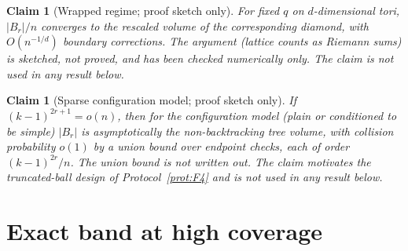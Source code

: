 \documentclass[pdflatex,sn-mathphys-num]{sn-jnl}
\theoremstyle{thmstyleone}%
\newtheorem{claim}[theorem]{Claim}
\theoremstyle{thmstylethree}%
\theoremstyle{thmstyletwo}%
\begin{document}
\begin{claim}[Wrapped regime; proof sketch only]
\label{prop:B4}
For fixed $q$ on $d$-dimensional tori, $|B_r|/n$ converges to the
rescaled volume of the corresponding diamond, with $O(n^{-1/d})$
boundary corrections. The argument (lattice counts as Riemann sums) is
sketched, not proved, and has been checked numerically only. The claim
is not used in any result below.
\end{claim}

\begin{claim}[Sparse configuration model; proof sketch only]
\label{prop:B5}
If $(k-1)^{2r+1}=o(n)$, then for the configuration model (plain or
conditioned to be simple) $|B_r|$ is asymptotically the non-backtracking
tree volume, with collision probability $o(1)$ by a union bound over
endpoint checks, each of order $(k-1)^{2r}/n$. The union bound is not
written out. The claim motivates the truncated-ball design of
Protocol~\ref{prot:F4} and is not used in any result below.
\end{claim}

\section{Exact band at high coverage}
\label{sec:C}

\setcounter{theorem}{-1}
\end{document}
